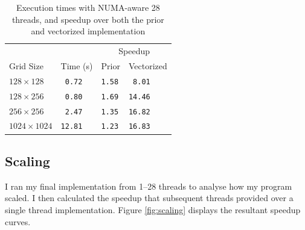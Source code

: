\documentclass[twocolumn, a4paper]{article}
\begin{document}
\begin{table}[htbp]
  \begin{center}
  \caption{Execution times with NUMA-aware 28 threads, and speedup over both the prior and vectorized implementation}\label{tab:numa}
  \begin{tabular}[t]{l | l  l  l} 
      \hline\hline
      &&\multicolumn{2}{c}{Speedup}\\
      \cline{3-4}
      Grid Size&Time (s)&Prior&Vectorized\\
      \hline
      $128 \times 128$&\texttt{ 0.72}&\texttt{1.58}&\texttt{ 8.01}\\
      $128 \times 256$&\texttt{ 0.80}&\texttt{1.69}&\texttt{14.46}\\
      $256 \times 256$&\texttt{ 2.47}&\texttt{1.35}&\texttt{16.82}\\
      $1024 \times 1024$&\texttt{12.81}&\texttt{1.23}&\texttt{16.83}\\
      \hline
    \end{tabular}
  \end{center}
\end{table}

\subsection{Scaling}

I ran my final implementation from 1--28 threads to analyse how my program scaled.
I then calculated the speedup that subsequent threads provided over a single thread implementation.
Figure \ref{fig:scaling} displays the resultant speedup curves.
\end{document}
